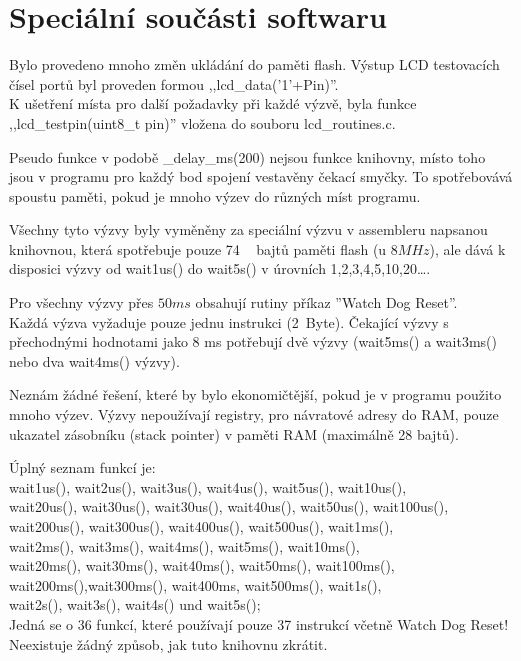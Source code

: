 \chapter{Speciální součásti softwaru}
\vspace*{-1cm}
Bylo provedeno mnoho změn ukládání do paměti flash.
Výstup LCD testovacích čísel portů byl proveden formou ,,lcd\_data('1'+Pin)''.
\\K ušetření místa pro další požadavky při každé výzvě, byla funkce ,,lcd\_testpin(uint8\_t pin)'' vložena do souboru lcd\_routines.c.

Pseudo funkce v podobě \_delay\_ms(200) nejsou funkce knihovny,
místo toho jsou v programu pro každý bod spojení vestavěny čekací smyčky.
To spotřebovává spoustu paměti, pokud je mnoho výzev do různých míst programu.

Všechny tyto výzvy byly vyměněny za speciální výzvu v assembleru napsanou knihovnou,
která spotřebuje pouze 74 ~ bajtů paměti flash (u \(8MHz\)),  ale
dává k disposici výzvy od wait1us() do wait5s() v úrovních 1,2,3,4,5,10,20\dots.

Pro všechny výzvy přes \(50ms\) obsahují rutiny příkaz ''Watch Dog Reset''.
\\Každá výzva vyžaduje pouze jednu instrukci (2~Byte). Čekající výzvy s přechodnými hodnotami
jako 8 ms potřebují dvě výzvy (wait5ms() a wait3ms() nebo dva wait4ms() výzvy).

Neznám žádné řešení, které by bylo ekonomičtější, pokud je v programu použito mnoho výzev.
Výzvy nepoužívají registry, pro návratové adresy do RAM, pouze ukazatel zásobníku (stack pointer)
v paměti RAM (maximálně 28 bajtů).

Úplný seznam funkcí je:\\
wait1us(), wait2us(), wait3us(), wait4us(), wait5us(), wait10us(), \\
wait20us(), wait30us(), wait30us(), wait40us(), wait50us(), wait100us(), \\
wait200us(), wait300us(), wait400us(), wait500us(), wait1ms(),\\
wait2ms(), wait3ms(), wait4ms(), wait5ms(), wait10ms(),\\
wait20ms(), wait30ms(), wait40ms(), wait50ms(), wait100ms(),\\
wait200ms(),wait300ms(), wait400ms, wait500ms(), wait1s(),\\
wait2s(), wait3s(), wait4s() und wait5s();\\

Jedná se o 36 funkcí, které používají pouze 37 instrukcí včetně Watch Dog Reset!
\\Neexistuje žádný způsob, jak tuto knihovnu zkrátit.\\

